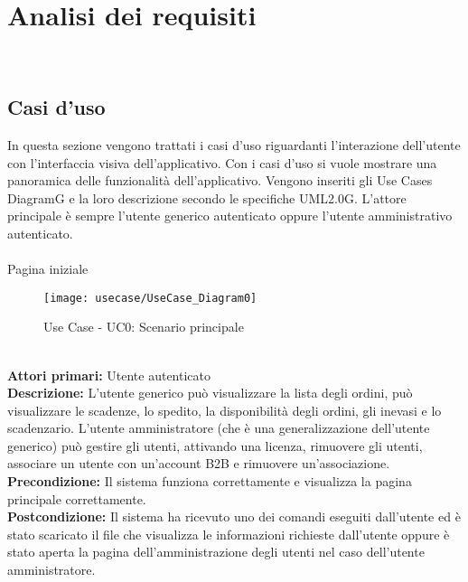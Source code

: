 
\chapter{Analisi dei requisiti}
\label{cap:analisi-requisiti}

\\


\section{Casi d'uso}

In questa sezione vengono trattati i casi d'uso riguardanti l'interazione dell'utente con l'interfaccia visiva dell'applicativo. Con i casi d'uso si vuole mostrare una panoramica delle funzionalità dell'applicativo. Vengono inseriti gli Use Cases DiagramG e la loro descrizione secondo le specifiche UML2.0G. L’attore principale è sempre l'utente generico autenticato oppure l'utente  amministrativo autenticato. \\\\
 Pagina iniziale \\
\begin{figure}[!h] 
    \centering 
    \texttt{[image: usecase/UseCase\_Diagram0]} 
    \caption{Use Case - UC0: Scenario principale}
\end{figure} 
\\
\textbf{Attori primari:}   Utente autenticato\\

\textbf{Descrizione:} L’utente generico può visualizzare la lista degli ordini, può visualizzare le scadenze, lo spedito, la disponibilità degli ordini, gli inevasi e lo scadenzario. L’utente amministratore (che è una generalizzazione dell’utente generico) può gestire gli utenti, attivando una licenza, rimuovere gli utenti, associare un utente con un’account B2B e rimuovere un’associazione. \\

\textbf{Precondizione:}  Il sistema funziona correttamente e visualizza la pagina principale correttamente. \\

\textbf{Postcondizione:} Il sistema ha ricevuto uno dei comandi eseguiti dall’utente ed è stato scaricato il file che visualizza le informazioni richieste dall’utente oppure è stato aperta la pagina dell’amministrazione degli utenti nel caso dell’utente amministratore.\\


